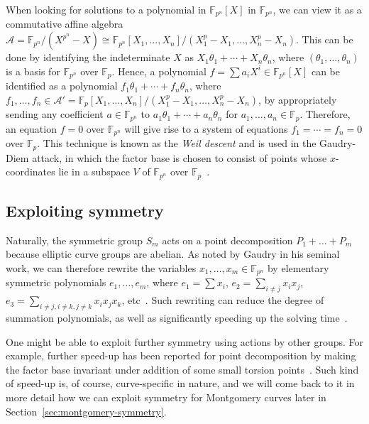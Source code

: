 \documentclass{llncs}
\newcommand{\F}[1]{\ensuremath{\mathbb F_{#1}}}
\begin{document}
When looking for solutions to a polynomial in $\F{p^n}[X]$ in \F{p^n},
we can view it as a commutative affine algebra
$\mathcal A=\F{p^n}/(X^{p^n} - X)\cong\F{p^n}[X_1,\ldots,X_n]/(X_1^p -
X_1,\ldots,X_n^p - X_n)$.
%
This can be done by identifying the indeterminate $X$ as
$X_1\theta_1+\cdots+X_n\theta_n$, where $(\theta_1,\ldots,\theta_n)$
is a basis for \F{p^n} over \F p.
%
Hence, a polynomial $f=\sum a_iX^i\in\F{p^n}[X]$ can be identified as
a polynomial $f_1\theta_1+\cdots+f_n\theta_n$, where
$f_1,\ldots,f_n\in\mathcal A'=\F p[X_1,\ldots,X_n]/(X_1^p -
X_1,\ldots,X_n^p - X_n)$, by appropriately sending any coefficient
$a\in\F{p^n}$ to $a_1\theta_1+\cdots+a_n\theta_n$ for
$a_1,\ldots,a_n\in\F p$.
%
Therefore, an equation $f=0$ over \F{p^n} will give rise to a system
of equations $f_1=\cdots=f_n=0$ over \F p.
%
This technique is known as the \emph{Weil descent} and is used in the
Gaudry-Diem attack, in which the factor base is chosen to consist of
points whose $x$-coordinates lie in a subspace $V$ of \F{p^n} over \F
p~\cite{DBLP:journals/jsc/Gaudry09,DBLP:journals/moc/Diem11}.

\subsection{Exploiting symmetry}
%
\label{sec:exploit-symmetry}
%
Naturally, the symmetric group $S_m$ acts on a point decomposition
$P_1+\ldots+P_m$ because elliptic curve groups are abelian.
%
As noted by Gaudry in his seminal work, we can therefore rewrite the
variables $x_1,\ldots,x_m\in\F{p^n}$ by elementary symmetric
polynomials $e_1,\ldots,e_m$, where $e_1=\sum x_i$,
$e_2=\sum_{i\neq j}x_ix_j$,
$e_3=\sum_{i\neq j,i\neq k,j\neq k}x_ix_jx_k$,
etc~\cite{DBLP:journals/jsc/Gaudry09}.
%
Such rewriting can reduce the degree of summation polynomials, as well
as significantly speeding up the solving
time~\cite{DBLP:conf/eurocrypt/FaugerePPR12,DBLP:conf/iwsec/HuangPST13}.

One might be able to exploit further symmetry using actions by other
groups.
%
For example, further speed-up has been reported for point
decomposition by making the factor base invariant under addition of
some small torsion
points~\cite{DBLP:conf/eurocrypt/FaugereHJRV14,DBLP:conf/indocrypt/GalbraithG14}.
%
Such kind of speed-up is, of course, curve-specific in nature, and we
will come back to it in more detail how we can exploit symmetry for
Montgomery curves later in Section~\ref{sec:montgomery-symmetry}.

\end{document}
